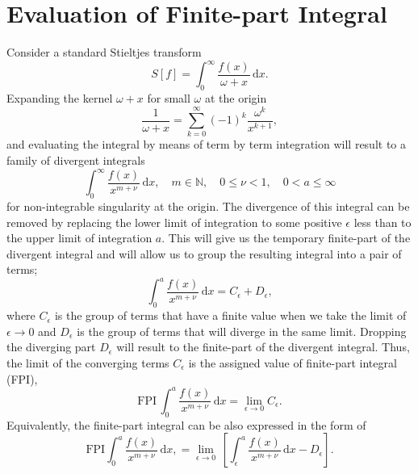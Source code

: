 \section{Evaluation of Finite-part Integral}

Consider a standard Stieltjes transform 
 \begin{equation}
     S[f] = \int_0^{\infty} \frac{f(x)}{\omega + x}\, \mathrm{d}x.
\end{equation}
Expanding the kernel $\omega + x$ for small $\omega$ at the origin 
\begin{equation}
    \frac{1}{\omega+x} = \sum_{k=0}^{\infty} (-1)^{k} \frac{\omega^{k}}{x^{k+1}},
\end{equation}
and evaluating the integral by means of term by term integration will result to a family of divergent integrals
 \begin{equation}
     \int_{0}^{\infty} \frac{f(x)}{x^{m+\nu}} \, \mathrm{d}x, \quad m \in \mathbb{N}, \quad 0 \leq \nu < 1, \quad 0 < a \leq \infty
     \label{4.33}
 \end{equation}
for non-integrable singularity at the origin. The divergence of this integral can be removed by replacing the lower limit of integration to some positive $\epsilon$ less than to the upper limit of integration $a$. This will give us the temporary finite-part of the divergent integral and will allow us to group the resulting integral into a pair of terms;
\begin{equation}
    \int_{0}^{a} \frac{f(x)}{x^{m+\nu}} \, \mathrm{d}x = C_\epsilon + D_\epsilon,
\end{equation}
where $C_\epsilon$ is the group of terms that have a finite value when we take the limit of $\epsilon \to 0$ and $D_\epsilon$ is the group of terms that will diverge in the same limit. Dropping the diverging part $D_\epsilon$ will result to the finite-part of the divergent integral. Thus, the limit of the converging terms $C_\epsilon$ is the assigned value of finite-part integral (FPI),
\begin{equation}
    \mathrm{FPI} \, \int_{0}^{a} \frac{f(x)}{x^{m+\nu}} \, \mathrm{d}x = \lim_{\epsilon \to 0} C_\epsilon.
\end{equation}
Equivalently, the finite-part integral can be also expressed in the form of
\begin{equation}
    \mathrm{FPI}  \int_{0}^{a} \frac{f(x)}{x^{m+\nu}} \, \mathrm{d}x, = \lim_{\epsilon \to 0} \, \left[ \int_{\epsilon}^{a} \frac{f(x)}{x^{m+\nu}} \, \mathrm{d}x - D_\epsilon \right].
    \label{FPI2}
\end{equation}
